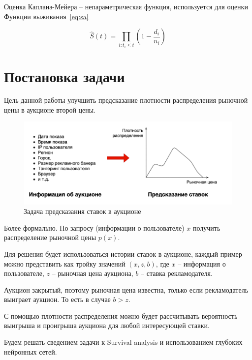 \documentclass[times,specification,annotation]{itmo-student-thesis}
\begin{document}
\begin{definition}
    Оценка Каплана-Мейера – непараметрическая функция, используется для оценки Функции выживания~\ref{eq:sa}
\end{definition}

\begin{equation}\label{eq:rm}
    \hat{S}(t) = \prod_{i: t_i \leq t} (1 - \frac{d_i}{n_i})
\end{equation}

\section{Постановка задачи}

Цель данной работы улучшить предсказание плотности распределения рыночной цены в аукционе второй цены.

\begin{figure}[h]\label{fig:problem}
    \caption{Задача предсказания ставок в аукционе}
    \centering
    \includegraphics{problem.png}
\end{figure}

Более формально. По запросу (информации о пользователе) $x$ получить распределение рыночной цены $p(x)$.

Для решения будет использоваться истории ставок в аукционе, 
каждый пример можно представить как тройку значений $(x, z, b)$, 
где $x$ – информация о пользователе, 
$z$ – рыночная цена аукциона, 
$b$ – ставка рекламодателя.

Аукцион закрытый, поэтому рыночная цена известна, только если рекламодатель выиграет аукцион. То есть в случае $b > z$.

С помощью плотности распределения можно будет рассчитывать вероятность выигрыша и проигрыша аукциона для любой интересующей ставки.

Будем решать сведением задачи к Survival analysis и использованием глубоких нейронных сетей.

\chapterconclusion
\end{document}
